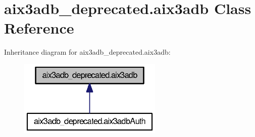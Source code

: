 \section{aix3adb\-\_\-deprecated.\-aix3adb Class Reference}
\label{classaix3adb__deprecated_1_1aix3adb}


Inheritance diagram for aix3adb\-\_\-deprecated.\-aix3adb\-:
\nopagebreak
\begin{figure}[H]
\begin{center}
\leavevmode
\includegraphics[width=194pt]{classaix3adb__deprecated_1_1aix3adb__inherit__graph}
\end{center}
\end{figure}
